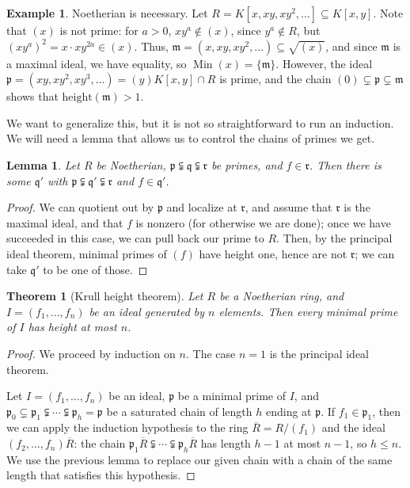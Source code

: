 \documentclass{amsart}[12pt]
\def\htt{\mathrm{height}}
\def\Min{\operatorname{Min}}
\newcommand{\p}{{\mathfrak p}}
\newcommand{\m}{{\mathfrak m}}
\newcommand{\q}{{\mathfrak q}}
\numberwithin{equation}{section}
\theoremstyle{plain} %
\newtheorem{theorem}[equation]{Theorem}
\newtheorem{lemma}[equation]{Lemma}
\theoremstyle{definition}
\newtheorem{ex}[equation]{Example}
\theoremstyle{remark}
\begin{document}
\begin{ex} Noetherian is necessary. Let $R=K[x,xy,xy^2,\dots] \subseteq K[x,y]$. Note that $(x)$ is not prime: for $a>0$, $xy^a \notin (x)$, since $y^a\notin R$, but $(xy^a)^2 = x \cdot x y^{2a}\in (x)$. Thus, $\m=(x,xy,xy^2,\dots) \subseteq \sqrt{(x)}$, and since $\m$ is a maximal ideal, we have equality, so $\Min{(x)}=\{\m\}$. However, the ideal $\p=(xy,xy^2, xy^3,\dots) = (y) K[x,y] \cap R$ is prime, and the chain $(0) \subsetneq \p \subsetneq \m$ shows that $\htt(\m)>1$.



We want to generalize this, but it is not so straightforward to run an induction. We will need a lemma that allows us to control the chains of primes we get.



\begin{lemma} Let $R$ be Noetherian, $\p\subsetneqq \q \subsetneqq \mathfrak{r}$ be primes, and $f\in \mathfrak{r}$. Then there is some $\q'$ with $\p\subsetneqq \q' \subsetneqq \mathfrak{r}$ and $f\in \q'$.
\end{lemma}
\begin{proof} We can quotient out by $\p$ and localize at $\mathfrak{r}$, and assume that $\mathfrak{r}$ is the maximal ideal, and that $f$ is nonzero (for otherwise we are done); once we have succeeded in this case, we can pull back our prime to $R$. Then, by the principal ideal theorem, minimal primes of $(f)$ have height one, hence are not $\mathfrak{r}$; we can take $\q'$ to be one of those.
\end{proof}

\begin{theorem}[Krull height theorem]
Let $R$ be a Noetherian ring, and $I=(f_1,\dots,f_n)$ be an ideal generated by $n$ elements. Then every minimal prime of $I$ has height at most $n$.
\end{theorem}
\begin{proof}
We proceed by induction on $n$. The case $n=1$ is the principal ideal theorem.

Let $I=(f_1,\dots,f_n)$ be an ideal, $\p$ be a minimal prime of $I$, and $\p_0 \subsetneq \p_1 \subsetneqq \cdots \subsetneqq \p_{h}=\p$ be a saturated chain of length $h$ ending at $\p$. If $f_1\in \p_1$, then we can apply the induction hypothesis to the ring $\overline{R}=R/(f_1)$ and the ideal $(f_2,\dots,f_n)\overline{R}$: the chain $\p_1 \overline{R} \subsetneqq \cdots \subsetneqq \p_{h} \overline{R}$ has length $h-1$ at most $n-1$, so $h\leq n$. We use the previous lemma to replace our given chain with a chain of the same length that satisfies this hypothesis.


\end{proof}
\end{ex}
\end{document}
